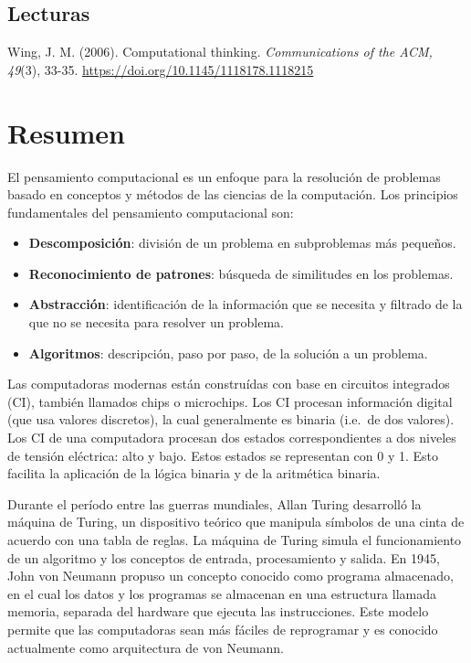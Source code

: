 \documentclass[
  letterpaper,
  DIV=11,
  numbers=noendperiod]{scrreprt}
\providecommand{\tightlist}{%
  \setlength{\itemsep}{0pt}\setlength{\parskip}{0pt}}\usepackage{longtable,booktabs,array}
\begin{document}
\hypertarget{lecturas-1}{%
\subsection{Lecturas}\label{lecturas-1}}

Wing, J. M. (2006). Computational thinking. \emph{Communications of the
ACM, 49}(3), 33-35. \url{https://doi.org/10.1145/1118178.1118215}

\hypertarget{resumen-2}{%
\section{Resumen}\label{resumen-2}}

El pensamiento computacional es un enfoque para la resolución de
problemas basado en conceptos y métodos de las ciencias de la
computación. Los principios fundamentales del pensamiento computacional
son:

\begin{itemize}
\tightlist
\item
  \textbf{Descomposición}: división de un problema en subproblemas más
  pequeños.
\item
  \textbf{Reconocimiento de patrones}: búsqueda de similitudes en los
  problemas.
\item
  \textbf{Abstracción}: identificación de la información que se necesita
  y filtrado de la que no se necesita para resolver un problema.
\item
  \textbf{Algoritmos}: descripción, paso por paso, de la solución a un
  problema.
\end{itemize}

Las computadoras modernas están construídas con base en circuitos
integrados (CI), también llamados chips o microchips. Los CI procesan
información digital (que usa valores discretos), la cual generalmente es
binaria (i.e.~de dos valores). Los CI de una computadora procesan dos
estados correspondientes a dos niveles de tensión eléctrica: alto y
bajo. Estos estados se representan con 0 y 1. Esto facilita la
aplicación de la lógica binaria y de la aritmética binaria.

Durante el período entre las guerras mundiales, Allan Turing desarrolló
la máquina de Turing, un dispositivo teórico que manipula símbolos de
una cinta de acuerdo con una tabla de reglas. La máquina de Turing
simula el funcionamiento de un algoritmo y los conceptos de entrada,
procesamiento y salida. En 1945, John von Neumann propuso un concepto
conocido como programa almacenado, en el cual los datos y los programas
se almacenan en una estructura llamada memoria, separada del hardware
que ejecuta las instrucciones. Este modelo permite que las computadoras
sean más fáciles de reprogramar y es conocido actualmente como
arquitectura de von Neumann.
\end{document}
